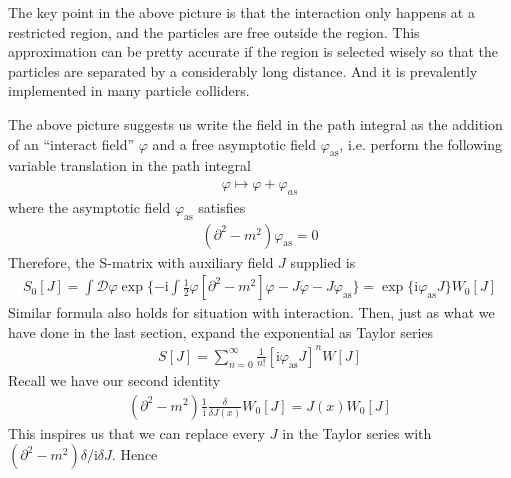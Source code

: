\documentclass[letterpaper,10pt,english]{sphinxmanual}
\begin{document}
The key point in the above picture is that the interaction only happens at a restricted region, and the particles are free outside the region. This approximation can be pretty accurate if the region is selected wisely so that the particles are separated by a considerably long distance. And it is prevalently implemented in many particle colliders.

The above picture suggests us write the field in the path integral as the addition of an ``interact field'' \(\varphi\) and a free asymptotic field \(\varphi_{\text{as}}\), i.e. perform the following variable translation in the path integral
\begin{equation*}
\begin{split}\varphi \mapsto \varphi + \varphi_{as}\end{split}
\end{equation*}
where the asymptotic field \(\varphi_{\text{as}}\) satisfies
\begin{equation*}
\begin{split}(\partial^2\!\!-\!m^2)\varphi_{\text{as}} = 0\end{split}
\end{equation*}
Therefore, the S-matrix with auxiliary field \(J\) supplied is
\begin{equation*}
\begin{split}S_0[J] = \int\mathcal{D}\varphi\exp\{-\mathrm{i}\int\frac{1}{2}\varphi[\partial^2\!\!-\!m^2]\varphi - J\varphi - J\varphi_{\text{as}}\} = \exp\{\mathrm{i}\varphi_{\text{as}}J\}W_0[J]\end{split}
\end{equation*}
Similar formula also holds for situation with interaction. Then, just as what we have done in the last section, expand the exponential as Taylor series
\begin{equation*}
\begin{split}S[J] = \sum_{n=0}^\infty\frac{1}{n!}\left[\mathrm{i}\varphi_{\text{as}}J\right]^nW[J]\end{split}
\end{equation*}
Recall we have our second identity
\begin{equation*}
\begin{split}(\partial^2\!\!-\!m^2)\frac{1}{\mathrm{i}}\frac{\delta}{\delta J(x)}W_0[J] = J(x)W_0[J]\end{split}
\end{equation*}
This inspires us that we can replace every \(J\) in the Taylor series with \((\partial^2\!\!-\!m^2)\delta/\mathrm{i}\delta J\). Hence
\end{document}
